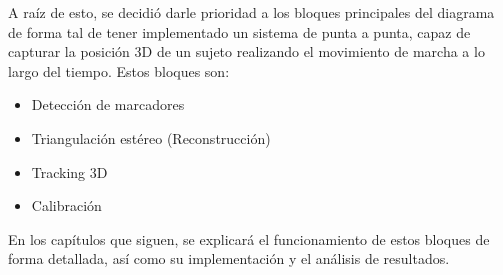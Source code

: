  A raíz de esto, se decidió darle prioridad a los bloques principales del diagrama de forma tal de tener implementado un sistema de punta a punta, capaz de capturar la posición 3D de un sujeto realizando el movimiento de marcha a lo largo del tiempo. Estos bloques son:
 \begin{itemize}
 	\item Detección de marcadores
 	\item Triangulación estéreo (Reconstrucción)
 	\item Tracking 3D
 	\item Calibración
 \end{itemize}

En los capítulos que siguen, se explicará el funcionamiento de estos bloques de forma detallada, así como su implementación y el análisis de resultados.